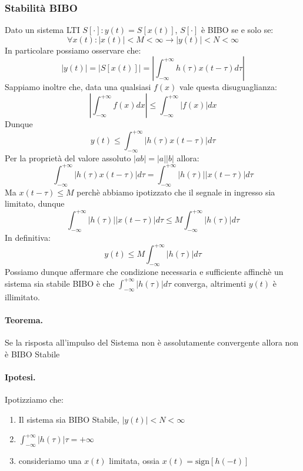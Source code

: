 \subsubsection{Stabilità BIBO} \label{prop: BIBO}
Dato un sistema LTI $S[\cdot] : y(t) = S[x(t)]$, $S[\cdot]$ è BIBO se e solo se:
\begin{equation}
    \forall x(t) : |x(t)| < M < \infty \rightarrow |y(t)| < N < \infty
\end{equation}
In particolare possiamo osservare che:
\begin{equation*}
    |y(t)| = |S[x(t)]| = \left|\int_{-\infty}^{+\infty} h(\tau) x(t - \tau) d\tau \right|
\end{equation*}
Sappiamo inoltre che, data una qualsiasi $f(x)$ vale questa disuguaglianza:
\begin{equation*}
    \left|\int_{-\infty}^{+\infty} f(x)dx \right| \leq \int_{-\infty}^{+\infty} |f(x)|dx
\end{equation*}
Dunque
\begin{equation*}
    y(t) \leq \int_{-\infty}^{+\infty} |h(\tau) x(t - \tau)|d\tau
\end{equation*}
Per la proprietà del valore assoluto $|ab| = |a||b|$ allora:
\begin{equation*}
    \int_{-\infty}^{+\infty} |h(\tau) x(t - \tau)|d\tau = \int_{-\infty}^{+\infty} |h(\tau)| |x(t - \tau)|d\tau
\end{equation*}
Ma $x(t - \tau) \leq M$ perchè abbiamo ipotizzato che il segnale in ingresso sia limitato, dunque
\begin{equation*}
    \int_{-\infty}^{+\infty} |h(\tau)| |x(t - \tau)|d\tau \leq M\int_{-\infty}^{+\infty} |h(\tau)|d\tau
\end{equation*}
In definitiva:
\begin{equation*}
    y(t) \leq M\int_{-\infty}^{+\infty} |h(\tau)|d\tau
\end{equation*}
Possiamo dunque affermare che condizione necessaria e sufficiente affinchè un sistema sia stabile BIBO è che $\int_{-\infty}^{+\infty} |h(\tau)|d\tau$ converga, altrimenti $y(t)$ è illimitato.\\
\paragraph{Teorema.} Se la risposta all'impulso del Sistema non è assolutamente convergente allora non è BIBO Stabile
\paragraph{Ipotesi. } Ipotizziamo che:
\begin{enumerate}
    \item Il sistema sia BIBO Stabile, $|y(t)| < N < \infty$
    \item $\int_{-\infty}^{+\infty} |h(\tau)| \tau = + \infty$
    \item consideriamo una $x(t)$ limitata, ossia $x(t) = \mbox{sign}[h(-t)]$ 
\end{enumerate}
